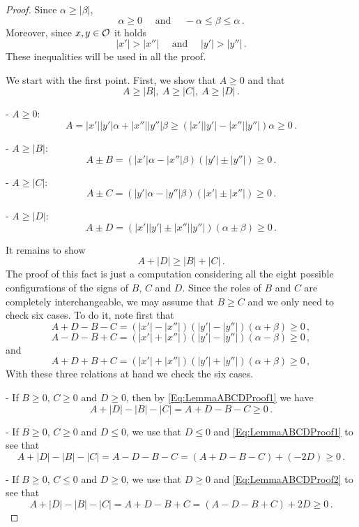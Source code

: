 \begin{proof}
Since $\alpha \geq |\beta |$,
$$
\alpha\geq 0 \quad \textrm{ and } \quad  -\alpha \leq \beta \leq \alpha\,.
$$
Moreover, since $x,y\in\mathcal{O}$ it holds
$$
|x'|>|x''| \quad \textrm{ and } \quad |y'|>|y''|\,.
$$
These inequalities will be used in all the proof.

We start with the first point. First,  we show that $A\geq 0$ and that
$$
A \geq |B|, \ A \geq |C| ,\ A \geq |D|\,.
$$


- $A \geq 0$:
$$
 A =  |x'||y'|  \alpha + |x''||y''|\beta \geq (|x'||y'|  - |x''||y''|)\alpha \geq 0\,.
$$

- $A \geq |B|$:
$$
A\pm B = (|x'|\alpha-|x''|\beta)(|y'|\pm |y''|) \geq 0\,.
$$

- $A \geq |C|$:
$$
A\pm C = (|y'|\alpha-|y''|\beta)(|x'|\pm |x''|)  \geq 0\,.
$$

- $A \geq |D|$:
$$
A\pm D = (|x'||y'| \pm |x''||y''|)(\alpha \pm \beta) \geq 0\,.
$$


It remains to show
$$
A + |D| \geq |B| + |C|\,.
$$
The proof of this fact is just a computation considering all the eight possible configurations of
the signs of $B$, $C$ and $D$. Since the roles of $B$ and $C$ are completely interchangeable, we
may assume that $B \geq C$ and we only need to check six cases. To do it, note first that
\begin{equation}
\label{Eq:LemmaABCDProof1}
A + D - B - C = (|x'|-|x''|)(|y'|-|y''|)(\alpha + \beta) \geq 0 \,,
\end{equation}
\begin{equation}
\label{Eq:LemmaABCDProof2}
A - D - B + C = (|x'|+|x''|)(|y'|-|y''|)(\alpha - \beta) \geq 0 \,,
\end{equation}
and
\begin{equation}
\label{Eq:LemmaABCDProof3}
A + D + B + C = (|x'|+|x''|)(|y'|+|y''|)(\alpha + \beta) \geq 0 \,,
\end{equation}
With these three relations at hand we check the six cases.

- If $B \geq 0$, $C \geq 0$ and $D \geq 0$, then by \eqref{Eq:LemmaABCDProof1} we have
$$
A + |D| - |B| - |C| = A + D - B - C \geq 0\,.
$$

- If $B \geq 0$, $C \geq 0$ and $D \leq 0$, we use that $D\leq 0$ and \eqref{Eq:LemmaABCDProof1} to
see that
$$
A + |D| - |B| - |C| = A - D - B - C =  (A + D - B - C) + (-2D) \geq 0\,.
$$

- If $B \geq 0$, $C \leq 0$ and $D \geq 0$, we use that $D\geq 0$ and \eqref{Eq:LemmaABCDProof2} to
see that
$$
A + |D| - |B| - |C| = A + D - B + C =  (A - D - B + C) + 2D \geq 0\,.
$$


\end{proof}
